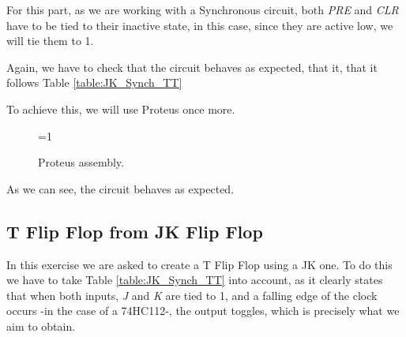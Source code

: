 For this part, as we are working with a Synchronous circuit, both \textit{PRE} and \textit{CLR} have to be tied to their inactive state, in this case, since they are active low, we will tie them to 1.

Again, we have to check that the circuit behaves as expected, that it, that it follows Table \ref{table:JK_Synch_TT}

\newpage

To achieve this, we will use Proteus once more.

\begin{figure}[H]
    \centering
    
    \ifnum\value{ANIMATION}=1 {
    } 
    \fi
    
    \caption{Proteus assembly.}
    \label{fig:PROTEUS_JK_SYNCH}
\end{figure}

As we can see, the circuit behaves as expected.


\subsection{T Flip Flop from JK Flip Flop}

In this exercise we are asked to create a T Flip Flop using a JK one. To do this we have to take Table \ref{table:JK_Synch_TT} into account, as it clearly states that when both inputs, \textit{J} and \textit{K} are tied to 1, and a falling edge of the clock occurs -in the case of a 74HC112-, the output toggles, which is precisely what we aim to obtain.


